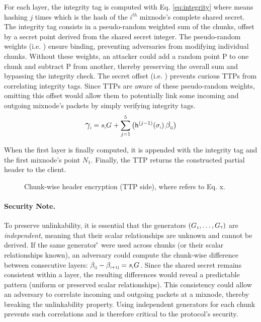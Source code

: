 \noindent
For each layer, the integrity tag is computed with Eq. \ref{eq:integrity} where  means hashing $j$ times  which is the hash of the $i^{th}$ mixnode's complete shared secret.
The integrity tag consists in a pseudo-random weighted sum of the chunks, offset by a secret point derived from the shared secret integer.
The pseudo-random weights (i.e. ) ensure binding, preventing adversaries from modifying individual chunks.
Without these weights, an attacker could add a random point P to one chunk and subtract P from another, thereby preserving the overall sum and bypassing the integrity check.
The secret offset (i.e. ) prevents curious TTPs from correlating integrity tags.
Since TTPs are aware of these pseudo-random weights, omitting this offset would allow them to potentially link some incoming and outgoing mixnode's packets by simply verifying integrity tags.
\begin{equation}
\C{i} = \sG{i}{} + \sum_{j=1}^{5} \big( \hashIt{\sHashed{i}}{j-1} \, \B{i}{j} \big)
\label{eq:integrity}
\end{equation}

When the first layer is finally computed, it is appended with the integrity tag  and the first mixnode’s point $ N_1 $.
Finally, the TTP returns the constructed partial header to the client.

\begin{figure}[H]
    \centering
    \resizebox{0.9\linewidth}{!}{}
    \caption{Chunk-wise header encryption (TTP side), where \eq[x] refers to Eq. x.}
    \label{fig:chunked_schema}
\end{figure}


\paragraph{\textbf{Security Note.}}\label{note:security_why_indep_generators}
To preserve unlinkability, it is essential that the generators $ (\G{1}, \dots, \G{7}) $ are \textit{independent}, meaning that their scalar relationships are unknown and cannot be derived.
If the same generator \G{} were used across chunks (or their scalar relationships known), an adversary could compute the chunk-wise difference between consecutive layers: $ \B{i}{j} - \B{i+1}{j} = \sG{i}{} $.
Since the shared secret  remains consistent within a layer, the resulting differences would reveal a predictable pattern (uniform or preserved scalar relationships).
This consistency could allow an adversary to correlate incoming and outgoing packets at a mixnode, thereby breaking the unlinkability property.
Using independent generators for each chunk prevents such correlations and is therefore critical to the protocol's security.  


